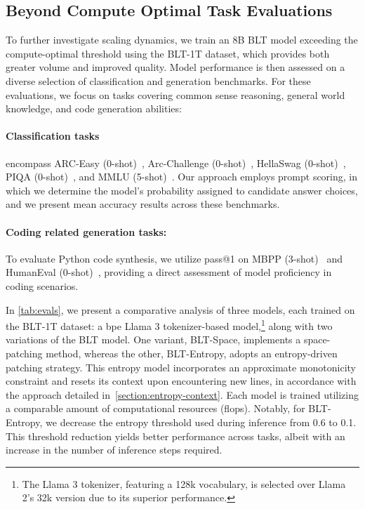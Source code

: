 \subsection{Beyond Compute Optimal Task Evaluations}
\label{section:evals}
To further investigate scaling dynamics, we train an 8B {\textsc BLT} model exceeding the compute-optimal threshold using the {\textsc BLT}-1T dataset, which provides both greater volume and improved quality. Model performance is then assessed on a diverse selection of classification and generation benchmarks. For these evaluations, we focus on tasks covering common sense reasoning, general world knowledge, and code generation abilities:
\paragraph{Classification tasks} encompass ARC-Easy (0-shot)~\citep{Eval_ARC}, Arc-Challenge (0-shot)~\citep{Eval_ARC}, HellaSwag (0-shot)~\citep{Eval_hellaswag}, PIQA (0-shot)~\citep{Eval_piqa}, and MMLU (5-shot)~\citep{hendrycks2020measuring}. Our approach employs prompt scoring, in which we determine the model's probability assigned to candidate answer choices, and we present mean accuracy results across these benchmarks.
\paragraph{Coding related generation tasks:}  To evaluate Python code synthesis, we utilize pass@1 on MBPP (3-shot)~\citep{Eval_MBPP} and HumanEval (0-shot)~\citep{Eval_HumanEval}, providing a direct assessment of model proficiency in coding scenarios.

In \autoref{tab:evals}, we present a comparative analysis of three models, each trained on the {\textsc BLT}-1T dataset: a bpe Llama 3 tokenizer-based model,\footnote{The Llama 3 tokenizer, featuring a 128k vocabulary, is selected over Llama 2’s 32k version due to its superior performance.} along with two variations of the {\textsc BLT} model. One variant, {\textsc BLT}-Space, implements a space-patching method, whereas the other, {\textsc BLT}-Entropy, adopts an entropy-driven patching strategy. This entropy model incorporates an approximate monotonicity constraint and resets its context upon encountering new lines, in accordance with the approach detailed in~\autoref{section:entropy-context}. Each model is trained utilizing a comparable amount of computational resources (flops). Notably, for {\textsc BLT}-Entropy, we decrease the entropy threshold used during inference from 0.6 to 0.1. This threshold reduction yields better performance across tasks, albeit with an increase in the number of inference steps required.

